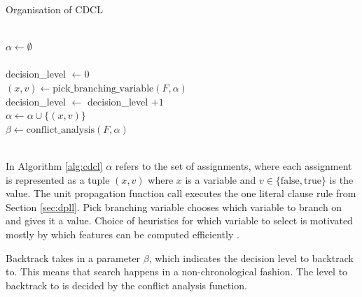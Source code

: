\begin{algorithm}
\caption{Organisation of CDCL \cite{biere2009conflict, CDCL}}
\label{alg:cdcl}
\vspace{5pt}
\hrulefill\\

\nl $\alpha \gets \emptyset$ \\
\nl {}
{
    \nl {} \\
}
\nl decision\_level $\gets 0$ \\
\nl {}
{
    \nl $(x,v) \gets \text{pick\_branching\_variable}(F, \alpha)$ \\
    \nl decision\_level $\gets$ decision\_level $+ 1$ \\
    \nl $\alpha \gets \alpha \cup \{(x,v)\}$ \\
    \nl {}
    {
        \nl $\beta \gets \text{conflict\_analysis}(F, \alpha)$ \\
        \nl {}
        {
            \nl {} \\
        }
        \nl {}
    }
}
\nl {}
\end{algorithm}

In Algorithm \ref{alg:cdcl} $\alpha$ refers to the set of assignments, where
each assignment is represented as a tuple $(x, v)$ where $x$ is a variable
and $v \in \{\text{false}, \text{true}\}$ is the value. The unit propagation
function call executes the one literal clause rule from Section \ref{sec:dpll}.
Pick branching variable chooses which variable to branch on and gives it a value.
Choice of heuristics for which variable to select is motivated mostly by which
features can be computed efficiently \cite{lewis2005speedup, moskewicz2001chaff}.

Backtrack takes in a parameter $\beta$, which indicates the decision level to
backtrack to. This means that search happens in a non-chronological fashion.
The level to backtrack to is decided by the conflict analysis function.

